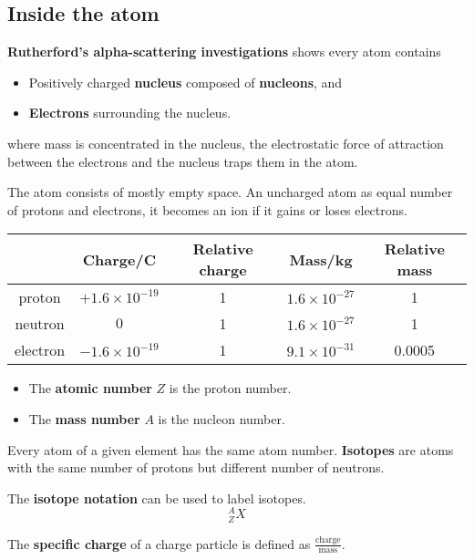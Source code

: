 \subsection{Inside the atom}

\textbf{Rutherford's alpha-scattering investigations} shows every atom contains
\begin{itemize}
    \item Positively charged \textbf{nucleus} composed of \textbf{nucleons}, and
    \item \textbf{Electrons} surrounding the nucleus.
\end{itemize}
where mass is concentrated in the nucleus, the electrostatic force of attraction between the electrons and the nucleus traps them in the atom.

The atom consists of mostly empty space. An uncharged atom as equal number of protons and electrons, it becomes an ion if it gains or loses electrons.

\begin{center}
\begin{tabular}{|c|c|c|c|c|}
    \hline
    & Charge/C & Relative charge & Mass/kg & Relative mass\\
    \hline
    proton & $+1.6\times10^{-19}$ & 1 & $1.6\times10^{-27}$ & 1\\
    neutron & $0$ & 1 & $1.6\times10^{-27}$ & 1\\
    electron & $-1.6\times10^{-19}$ & 1 & $9.1\times10^{-31}$ & 0.0005\\
    \hline
\end{tabular}
\end{center}

\begin{itemize}
    \item The \textbf{atomic number} $Z$ is the proton number.
    \item The \textbf{mass number} $A$ is the nucleon number.
\end{itemize}

Every atom of a given element has the same atom number. \textbf{Isotopes} are atoms with the same number of protons but different number of neutrons.

The \textbf{isotope notation} can be used to label isotopes.
$$^A_ZX$$

The \textbf{specific charge} of a charge particle is defined as $\frac{\text{charge}}{\text{mass}}$.
